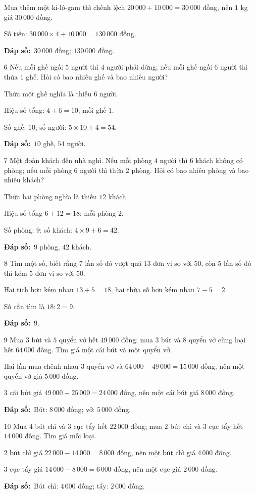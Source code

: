 \documentclass[11pt]{article}
\newif\ifsol \solfalse
\providecommand{\AnsWord}{Đáp số}
\newcommand{\dapso}[1]{\par\textbf{\AnsWord:}\ #1}
\newcommand{\probsol}[1]{%
  \begin{lrbox}{\solmeasure}\begin{minipage}{\dimexpr\linewidth-24pt\relax}#1\end{minipage}\end{lrbox}%
  \ifsol
    \begin{solbox}#1\end{solbox}%
  \else
    \setlength{\solht}{\dimexpr\ht\solmeasure+\dp\solmeasure+0.85cm\relax}%
    \ifdim\solht<1.35cm\setlength{\solht}{1.35cm}\fi
    \begin{tcolorbox}[colback=white,colframe=Line,boxrule=0.8pt,arc=5pt,
      left=8pt,right=8pt,top=4pt,bottom=4pt,height=\solht]{\footnotesize\color{Slate}\itshape\WorkWord}\end{tcolorbox}%
  \fi}
\newcommand{\gap}{\vspace{0.3cm}}
\def\WorkWord{Bài làm:}
\def\AnsWord{Đáp số}
\begin{document}
\probsol{
Mua thêm một ki-lô-gam thì chênh lệch $20\,000+10\,000=30\,000$ đồng, nên $1$ kg giá $30\,000$ đồng.\par Số tiền: $30\,000\times4+10\,000=130\,000$ đồng.
\dapso{$30\,000$ đồng; $130\,000$ đồng.}}
\gap
\begin{probbox}{6}{\relax}
Nếu mỗi ghế ngồi $5$ người thì $4$ người phải đứng; nếu mỗi ghế ngồi $6$ người thì thừa $1$ ghế. Hỏi có bao nhiêu ghế và bao nhiêu người?
\end{probbox}
\probsol{
Thừa một ghế nghĩa là thiếu $6$ người.\par Hiệu số tổng: $4+6=10$; mỗi ghế $1$.\par Số ghế: $10$; số người: $5\times10+4=54$.
\dapso{$10$ ghế, $54$ người.}}
\gap
\begin{probbox}{7}{\relax}
Một đoàn khách đến nhà nghỉ. Nếu mỗi phòng $4$ người thì $6$ khách không có phòng; nếu mỗi phòng $6$ người thì thừa $2$ phòng. Hỏi có bao nhiêu phòng và bao nhiêu khách?
\end{probbox}
\probsol{
Thừa hai phòng nghĩa là thiếu $12$ khách.\par Hiệu số tổng $6+12=18$; mỗi phòng $2$.\par Số phòng: $9$; số khách: $4\times9+6=42$.
\dapso{$9$ phòng, $42$ khách.}}
\gap
\begin{probbox}{8}{\relax}
Tìm một số, biết rằng $7$ lần số đó vượt quá $13$ đơn vị so với $50$, còn $5$ lần số đó thì kém $5$ đơn vị so với $50$.
\end{probbox}
\probsol{
Hai tích hơn kém nhau $13+5=18$, hai thừa số hơn kém nhau $7-5=2$.\par Số cần tìm là $18:2=9$.
\dapso{$9$.}}
\gap
\begin{probbox}{9}{\relax}
Mua $3$ bút và $5$ quyển vở hết $49\,000$ đồng; mua $3$ bút và $8$ quyển vở cùng loại hết $64\,000$ đồng. Tìm giá một cái bút và một quyển vở.
\end{probbox}
\probsol{
Hai lần mua chênh nhau $3$ quyển vở và $64\,000-49\,000=15\,000$ đồng, nên một quyển vở giá $5\,000$ đồng.\par
$3$ cái bút giá $49\,000-25\,000=24\,000$ đồng, nên một cái bút giá $8\,000$ đồng.
\dapso{Bút: $8\,000$ đồng; vở: $5\,000$ đồng.}}
\gap
\begin{probbox}{10}{\relax}
Mua $4$ bút chì và $3$ cục tẩy hết $22\,000$ đồng; mua $2$ bút chì và $3$ cục tẩy hết $14\,000$ đồng. Tìm giá mỗi loại.
\end{probbox}
\probsol{
$2$ bút chì giá $22\,000-14\,000=8\,000$ đồng, nên một bút chì giá $4\,000$ đồng.\par $3$ cục tẩy giá $14\,000-8\,000=6\,000$ đồng, nên một cục giá $2\,000$ đồng.
\dapso{Bút chì: $4\,000$ đồng; tẩy: $2\,000$ đồng.}}
\end{document}
